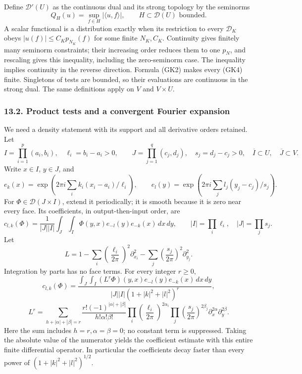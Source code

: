 \documentclass[
  11pt,
]{article}
\begin{document}
Define \(\mathcal D'(U)\) as the continuous dual and its strong topology
by the seminorms \[
 Q_H(u)=\sup_{f\in H}|\langle u,f\rangle|,
 \qquad H\subset\mathcal D(U)\text{ bounded}.
 \tag{GK4}
\] A scalar functional is a distribution exactly when its restriction to
every \(\mathcal D_K\) obeys \(|u(f)|\leq C_Kp_{N_K}(f)\) for some
finite \(N_K,C_K\). Continuity gives finitely many seminorm constraints;
their increasing order reduces them to one \(p_N\), and rescaling gives
this inequality, including the zero-seminorm case. The inequality
implies continuity in the reverse direction. Formula (GK2) makes every
(GK4) finite. Singletons of tests are bounded, so their evaluations are
continuous in the strong dual. The same definitions apply on \(V\) and
\(V\times U\).

\subsubsection{13.2. Product tests and a convergent Fourier
expansion}\label{product-tests-and-a-convergent-fourier-expansion}

We need a density statement with its support and all derivative orders
retained. Let \[
 I=\prod_{i=1}^p(a_i,b_i),\quad \ell_i=b_i-a_i>0,\qquad
 J=\prod_{j=1}^q(c_j,d_j),\quad s_j=d_j-c_j>0,
 \quad \overline I\subset U,\quad\overline J\subset V.
 \tag{GK5}
\] Write \(x\in I\), \(y\in J\), and \[
 e_k(x)=\exp\!\left(2\pi i\sum_i k_i(x_i-a_i)/\ell_i\right),\qquad
 e_l(y)=\exp\!\left(2\pi i\sum_j l_j(y_j-c_j)/s_j\right).
 \tag{GK6}
\] For \(\Phi\in\mathcal D(J\times I)\), extend it periodically; it is
smooth because it is zero near every face. Its coefficients, in
output-then-input order, are \[
 c_{l,k}(\Phi)=\frac1{|J||I|}
       \int_J\int_I\Phi(y,x)e_{-l}(y)e_{-k}(x)\,dx\,dy,
 \qquad |I|=\prod_i\ell_i,\quad |J|=\prod_j s_j.
 \tag{GK7}
\] Let \[
 L=1-\sum_i\left(\frac{\ell_i}{2\pi}\right)^2\partial_{x_i}^2
       -\sum_j\left(\frac{s_j}{2\pi}\right)^2\partial_{y_j}^2 .
 \tag{GK8}
\] Integration by parts has no face terms. For every integer \(r\geq0\),
\[
 c_{l,k}(\Phi)=
  \frac{\int_J\int_I(L^r\Phi)(y,x)e_{-l}(y)e_{-k}(x)\,dx\,dy}
       {|J||I|(1+|k|^2+|l|^2)^r},
\] \[
 L^r=\sum_{h+|\alpha|+|\beta|=r}
 \frac{r!(-1)^{|\alpha|+|\beta|}}{h!\alpha!\beta!}
 \prod_i\left(\frac{\ell_i}{2\pi}\right)^{2\alpha_i}
 \prod_j\left(\frac{s_j}{2\pi}\right)^{2\beta_j}
 \partial_x^{2\alpha}\partial_y^{2\beta}.
 \tag{GK9}
\] Here the sum includes \(h=r,\alpha=\beta=0\); no constant term is
suppressed. Taking the absolute value of the numerator yields the
coefficient estimate with this entire finite differential operator. In
particular the coefficients decay faster than every power of
\((1+|k|^2+|l|^2)^{1/2}\).
\end{document}
